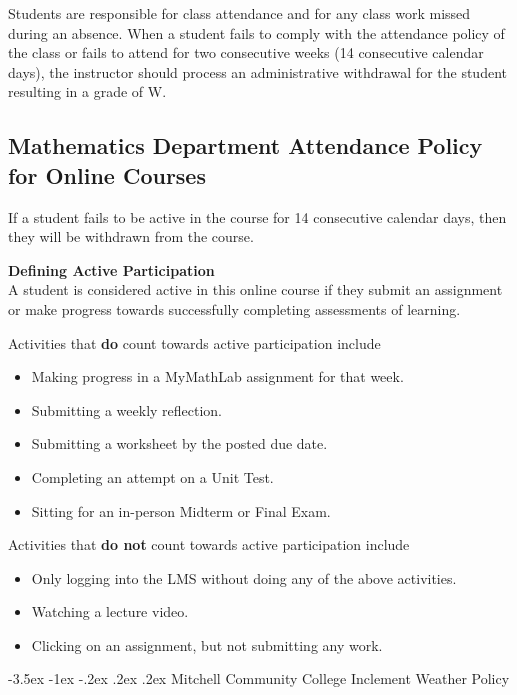 \documentclass{article}
\makeatletter
\renewcommand\section{\@startsection{section}{1}{0pt}%
  {-3.5ex \@plus -1ex \@minus -.2ex}%
  {.2ex \@plus.2ex}%
  {\normalfont\Large\bfseries}} %
\renewenvironment{framed}[1][]{%
  \def\FrameCommand{%
    \hspace{1pt}%
    {\color{mybordercolor}\vrule width 2pt} %
    \hspace{1pt}%
    \fboxsep=\FrameSep%
    \colorbox{mybgcolor}%
  }%
  \MakeFramed {\advance\hsize-\width \FrameRestore}%
}{%
  \endMakeFramed
}
\makeatother
\begin{document}
Students are responsible for class attendance and for any class work missed during an absence. When a student fails to comply with the attendance policy of the class or fails to attend for two consecutive weeks (14 consecutive calendar days), the instructor should process an administrative withdrawal for the student resulting in a grade of W.

\subsection{Mathematics Department Attendance Policy for Online Courses}

If a student fails to be active in the course for 14 consecutive calendar days, then they will be withdrawn from the course.

\begin{framed}
\textbf{Defining Active Participation}\\
A student is considered active in this online course if they submit an assignment or make progress towards successfully completing assessments of learning.

Activities that \textbf{do} count towards active participation include

\begin{itemize}
\item Making progress in a MyMathLab assignment for that week.
\item Submitting a weekly reflection.
\item Submitting a worksheet by the posted due date.
\item Completing an attempt on a Unit Test.
\item Sitting for an in-person Midterm or Final Exam.
\end{itemize}

Activities that \textbf{do not} count towards active participation include

\begin{itemize}
\item Only logging into the LMS without doing any of the above activities.
\item Watching a lecture video.
\item Clicking on an assignment, but not submitting any work.
\end{itemize}
\end{framed}

\section{Mitchell Community College Inclement Weather Policy}
\end{document}
